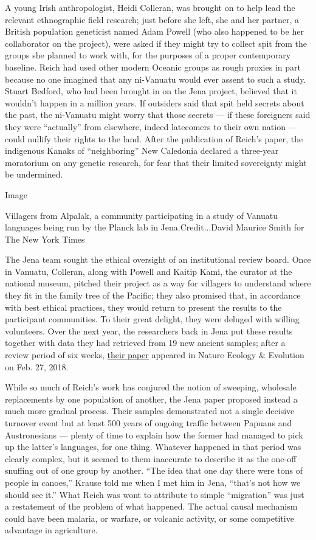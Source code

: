 A young Irish anthropologist, Heidi Colleran, was brought on to help
lead the relevant ethnographic field research; just before she left, she
and her partner, a British population geneticist named Adam Powell (who
also happened to be her collaborator on the project), were asked if they
might try to collect spit from the groups she planned to work with, for
the purposes of a proper contemporary baseline. Reich had used other
modern Oceanic groups as rough proxies in part because no one imagined
that any ni-Vanuatu would ever assent to such a study. Stuart Bedford,
who had been brought in on the Jena project, believed that it wouldn't
happen in a million years. If outsiders said that spit held secrets
about the past, the ni-Vanuatu might worry that those secrets --- if
these foreigners said they were ``actually'' from elsewhere, indeed
latecomers to their own nation --- could nullify their rights to the
land. After the publication of Reich's paper, the indigenous Kanaks of
``neighboring'' New Caledonia declared a three-year moratorium on any
genetic research, for fear that their limited sovereignty might be
undermined.

Image

Villagers from Alpalak, a community participating in a study of Vanuatu
languages being run by the Planck lab in Jena.Credit...David Maurice
Smith for The New York Times

The Jena team sought the ethical oversight of an institutional review
board. Once in Vanuatu, Colleran, along with Powell and Kaitip Kami, the
curator at the national museum, pitched their project as a way for
villagers to understand where they fit in the family tree of the
Pacific; they also promised that, in accordance with best ethical
practices, they would return to present the results to the participant
communities. To their great delight, they were deluged with willing
volunteers. Over the next year, the researchers back in Jena put these
results together with data they had retrieved from 19 new ancient
samples; after a review period of six weeks,
\href{https://www.nature.com/articles/s41559-018-0498-2}{their paper}
appeared in Nature Ecology \& Evolution on Feb. 27, 2018.

While so much of Reich's work has conjured the notion of sweeping,
wholesale replacements by one population of another, the Jena paper
proposed instead a much more gradual process. Their samples demonstrated
not a single decisive turnover event but at least 500 years of ongoing
traffic between Papuans and Austronesians --- plenty of time to explain
how the former had managed to pick up the latter's languages, for one
thing. Whatever happened in that period was clearly complex, but it
seemed to them inaccurate to describe it as the one-off snuffing out of
one group by another. ``The idea that one day there were tons of people
in canoes,'' Krause told me when I met him in Jena, ``that's not how we
should see it.'' What Reich was wont to attribute to simple
``migration'' was just a restatement of the problem of what happened.
The actual causal mechanism could have been malaria, or warfare, or
volcanic activity, or some competitive advantage in agriculture.

